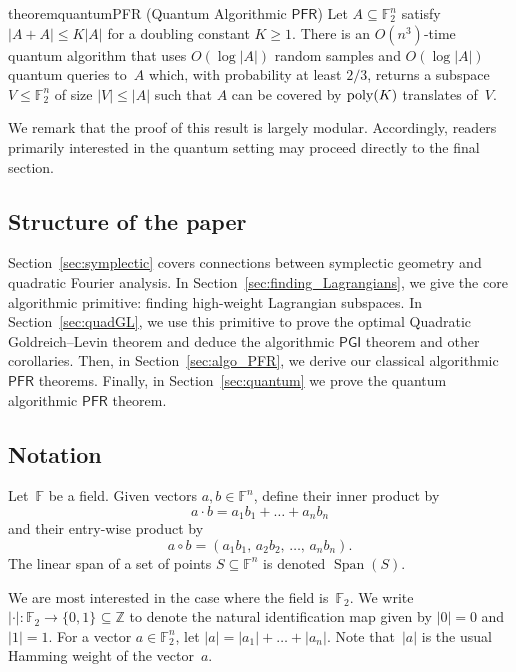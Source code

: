 \documentclass[11pt]{amsart}
\newcommand{\Z}{\mathbb{Z}} %
\newcommand{\F}{\mathbb{F}} %
\newcommand{\bset}[1]{\{0,1\}^{#1}} %
\DeclareMathOperator{\vspan}{Span} %
\newcommand{\PFR}{\textsf{PFR}}
\newcommand{\PGI}{\textsf{PGI}}
\newcommand{\poly}{\mbox{\rm poly}}
\theoremstyle{plain}
\theoremstyle{definition}
\theoremstyle{remark}
\begin{document}
\begin{restatable}{theorem}{quantumPFR}
\label{thm:quantumPFR} (Quantum Algorithmic $\PFR$)
    Let $A \subseteq \mathbb{F}_2^n$ satisfy $|A + A| \leq K|A|$ for a doubling constant $K \geq 1$.
    There is an $O(n^3)$-time quantum algorithm that uses $O(\log|A|)$ random samples and $O(\log |A|)$ quantum queries to~$A$ which, with probability at least $2/3$, returns a subspace $V \leq \mathbb{F}_2^n$ of size $|V| \leq |A|$ such that $A$ can be covered by $\poly(K)$ translates of~$V$.
\end{restatable}

We remark that the proof of this result is largely modular.
Accordingly, readers primarily interested in the quantum setting may proceed directly to the final section.


\subsection{Structure of the paper} Section~\ref{sec:symplectic} covers connections between symplectic geometry and quadratic Fourier analysis.
In Section~\ref{sec:finding_Lagrangians}, we give the core algorithmic primitive: finding high-weight Lagrangian subspaces.
In Section~\ref{sec:quadGL}, we use this primitive to prove the optimal Quadratic Goldreich--Levin theorem and deduce the algorithmic $\PGI$ theorem and other corollaries.
Then, in Section~\ref{sec:algo_PFR}, we derive our classical algorithmic $\PFR$ theorems.
Finally, in Section~\ref{sec:quantum} we prove the quantum algorithmic $\PFR$ theorem.


\subsection{Notation}
\label{sec:notation}

Let~$\F$ be a field.
Given vectors $a, b\in \F^n$, define their inner product by
$$a\cdot b = a_1b_1 + \dots+ a_nb_n$$
and their entry-wise product by
$$a\circ b = (a_1b_1,\, a_2 b_2,\, \dots,\, a_nb_n).$$
The linear span of a set of points $S\subseteq \F^n$ is denoted $\vspan(S)$.

We are most interested in the case where the field is~$\F_2$.
We write $|\cdot|: \F_2 \to \bset{}\subseteq\Z$ to denote the natural identification map given by $|0| = 0$ and $|1| = 1$.
For a vector $a\in \F_2^n$, let $|a| = |a_1| + \dots + |a_n|$.
Note that~$|a|$ is the usual Hamming weight of the vector~$a$.
\end{document}

